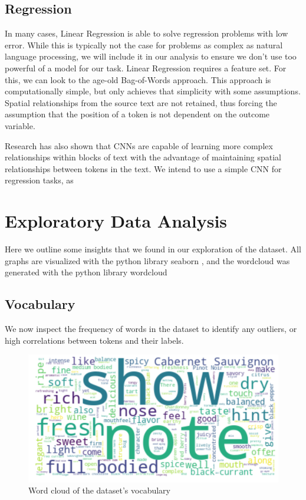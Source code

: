 \documentclass[10pt]{IEEEtran}
\begin{document}
\subsection{Regression}
    In many cases, Linear Regression is able to solve regression problems with low error. While this is typically not the case for problems as complex as natural language processing, we will include it in our analysis to ensure we don't use too powerful of a model for our task. Linear Regression requires a feature set. For this, we can look to the age-old Bag-of-Words approach\cite{bag_of_words}. This approach is computationally simple, but only achieves that simplicity with some assumptions. Spatial relationships from the source text are not retained, thus forcing the assumption that the position of a token is not dependent on the outcome variable.\par
    Research has also shown that CNNs are capable of learning more complex relationships within blocks of text with the advantage of maintaining spatial relationships between tokens in the text\cite{cnn}. We intend to use a simple CNN for regression tasks, as 
    


\section{Exploratory Data Analysis}
    Here we outline some insights that we found in our exploration of the dataset. All graphs are visualized with the python library seaborn \cite{seaborn}, and the wordcloud was generated with the python library wordcloud \cite{wordcloud}

\subsection{Vocabulary}
    We now inspect the frequency of words in the dataset to identify any outliers, or high correlations between tokens and their labels.

    \begin{figure}
    \centering
    \includegraphics[width=\columnwidth]{wordcloud}
    \caption{Word cloud of the dataset's vocabulary}
    \end{figure}
\end{document}

